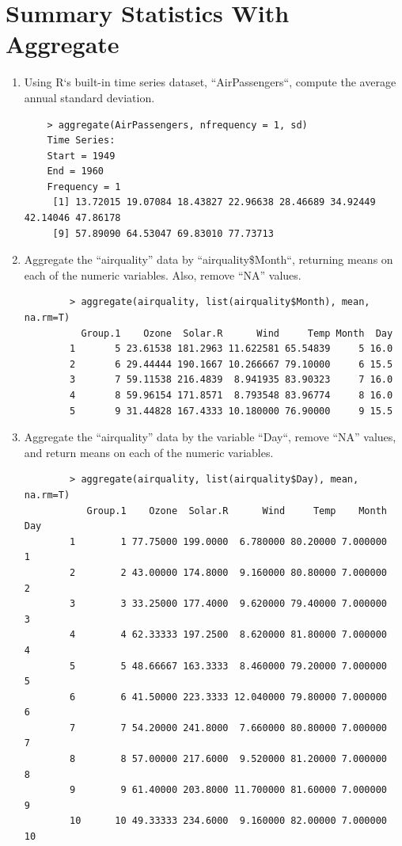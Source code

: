\documentclass[10pt]{article}
\begin{document}
\section{Summary Statistics With Aggregate}
\begin{enumerate}
    \item Using R‘s built-in time series dataset, “AirPassengers“, compute the average annual standard deviation.
    \begin{verbatim}
    > aggregate(AirPassengers, nfrequency = 1, sd)
    Time Series:
    Start = 1949 
    End = 1960 
    Frequency = 1 
     [1] 13.72015 19.07084 18.43827 22.96638 28.46689 34.92449 42.14046 47.86178
     [9] 57.89090 64.53047 69.83010 77.73713
    \end{verbatim}
    \item Aggregate the “airquality” data by “airquality\$Month“, returning means on each of the numeric variables. Also, remove “NA” values.
        \begin{verbatim}
        > aggregate(airquality, list(airquality$Month), mean, na.rm=T)
          Group.1    Ozone  Solar.R      Wind     Temp Month  Day
        1       5 23.61538 181.2963 11.622581 65.54839     5 16.0
        2       6 29.44444 190.1667 10.266667 79.10000     6 15.5
        3       7 59.11538 216.4839  8.941935 83.90323     7 16.0
        4       8 59.96154 171.8571  8.793548 83.96774     8 16.0
        5       9 31.44828 167.4333 10.180000 76.90000     9 15.5
        \end{verbatim}
    \item Aggregate the “airquality” data by the variable “Day“, remove “NA” values, and return means on each of the numeric variables.
        \begin{verbatim}
        > aggregate(airquality, list(airquality$Day), mean, na.rm=T)
           Group.1    Ozone  Solar.R      Wind     Temp    Month Day
        1        1 77.75000 199.0000  6.780000 80.20000 7.000000   1
        2        2 43.00000 174.8000  9.160000 80.80000 7.000000   2
        3        3 33.25000 177.4000  9.620000 79.40000 7.000000   3
        4        4 62.33333 197.2500  8.620000 81.80000 7.000000   4
        5        5 48.66667 163.3333  8.460000 79.20000 7.000000   5
        6        6 41.50000 223.3333 12.040000 79.80000 7.000000   6
        7        7 54.20000 241.8000  7.660000 80.80000 7.000000   7
        8        8 57.00000 217.6000  9.520000 81.20000 7.000000   8
        9        9 61.40000 203.8000 11.700000 81.60000 7.000000   9
        10      10 49.33333 234.6000  9.160000 82.00000 7.000000  10

\end{verbatim}
\end{enumerate}
\end{document}
